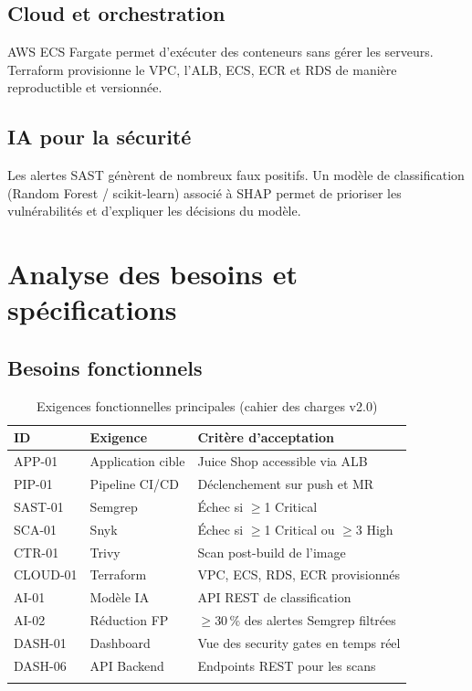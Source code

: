 \documentclass[12pt,a4paper]{report}
\begin{document}
\section{Cloud et orchestration}
AWS ECS Fargate permet d'exécuter des conteneurs sans gérer les serveurs. Terraform provisionne le VPC, l'ALB, ECS, ECR et RDS de manière reproductible et versionnée.

\section{IA pour la sécurité}
Les alertes SAST génèrent de nombreux faux positifs. Un modèle de classification (Random Forest / scikit-learn) associé à SHAP permet de prioriser les vulnérabilités et d'expliquer les décisions du modèle.

\chapter{Analyse des besoins et spécifications}
\label{ch:specs}

\section{Besoins fonctionnels}
\begin{longtable}{@{}p{2cm}p{5cm}p{6cm}@{}}
\toprule
\textbf{ID} & \textbf{Exigence} & \textbf{Critère d'acceptation} \\
\midrule
\endhead
APP-01 & Application cible & Juice Shop accessible via ALB \\
PIP-01 & Pipeline CI/CD & Déclenchement sur push et MR \\
SAST-01 & Semgrep & Échec si $\geq$1 Critical \\
SCA-01 & Snyk & Échec si $\geq$1 Critical ou $\geq$3 High \\
CTR-01 & Trivy & Scan post-build de l'image \\
CLOUD-01 & Terraform & VPC, ECS, RDS, ECR provisionnés \\
AI-01 & Modèle IA & API REST de classification \\
AI-02 & Réduction FP & $\geq$30\,\% des alertes Semgrep filtrées \\
DASH-01 & Dashboard & Vue des security gates en temps réel \\
DASH-06 & API Backend & Endpoints REST pour les scans \\
\bottomrule
\caption{Exigences fonctionnelles principales (cahier des charges v2.0)}
\end{longtable}
\end{document}
